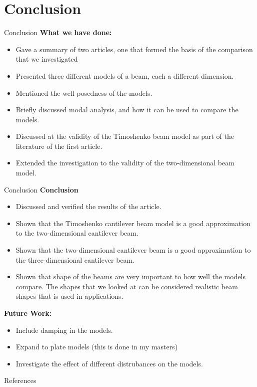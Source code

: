 \documentclass[8pt]{beamer}
\begin{document}
\section{Conclusion}
    \begin{frame}{Conclusion}
        \textbf{What we have done:}
        \begin{itemize}
            \item Gave a summary of two articles, one that formed the basis of the comparison that we investigated
            \item Presented three different models of a beam, each a different dimension.
            \item Mentioned the well-posedness of the models.
            \item Briefly discussed modal analysis, and how it can be used to compare the models.
            \item Discussed at the validity of the Timoshenko beam model as part of the literature of the first article.
            \item Extended the investigation to the validity of the two-dimensional beam model.
        \end{itemize}

    \end{frame}
    \begin{frame}{Conclusion}
        \textbf{Conclusion}
        \begin{itemize}
            \item Discussed and verified the results of the article.
            \item Shown that the Timoshenko cantilever beam model is a good approximation to the two-dimensional cantilever beam.
            \item Shown that the two-dimensional cantilever beam is a good approximation to the three-dimensional cantilever beam.
            \item Shown that shape of the beams are very important to how well the models compare. The shapes that we looked at can be considered realistic beam shapes that is used in applications.
        \end{itemize}

        \textbf{Future Work:}
        \begin{itemize}
            \item Include damping in the models.
            \item Expand to plate models (this is done in my masters)
            \item Investigate the effect of different distrubances on the models.
        \end{itemize}
    \end{frame}

    \begin{frame}{References}
        \printbibliography[heading=bibintoc, title={References}]
    \end{frame}
\end{document}
